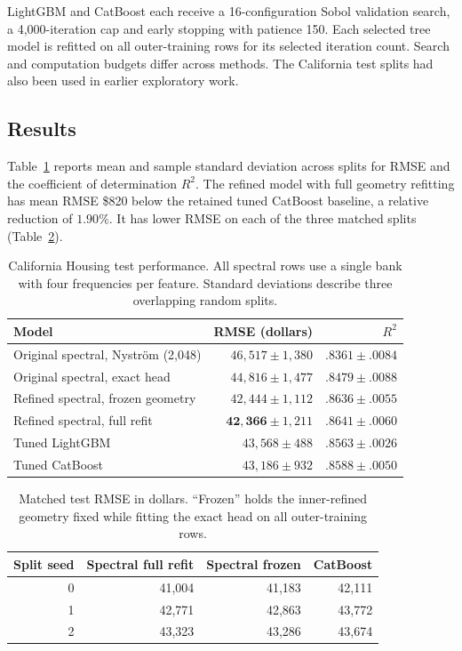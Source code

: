 \documentclass[11pt]{article}
\begin{document}
LightGBM \cite{ke2017} and CatBoost \cite{prokhorenkova2018} each receive a 16-configuration Sobol validation search, a 4,000-iteration cap and early stopping with patience 150. Each selected tree model is refitted on all outer-training rows for its selected iteration count. Search and computation budgets differ across methods. The California test splits had also been used in earlier exploratory work.

\subsection{Results}
Table~\ref{tab:results} reports mean and sample standard deviation across splits for RMSE and the coefficient of determination $R^2$. The refined model with full geometry refitting has mean RMSE \$820 below the retained tuned CatBoost baseline, a relative reduction of $1.90\%$. It has lower RMSE on each of the three matched splits (Table~\ref{tab:splits}).

\begin{table}[htbp]
\centering\small
\caption{California Housing test performance. All spectral rows use a single bank with four frequencies per feature. Standard deviations describe three overlapping random splits.}\label{tab:results}
\begin{tabular}{lrr}\toprule
Model & RMSE (dollars) & $R^2$ \\\midrule
Original spectral, Nystr\"om (2,048) & $46{,}517\pm1{,}380$ & $.8361\pm.0084$\\
Original spectral, exact head & $44{,}816\pm1{,}477$ & $.8479\pm.0088$\\
Refined spectral, frozen geometry & $42{,}444\pm1{,}112$ & $.8636\pm.0055$\\
Refined spectral, full refit & $\mathbf{42{,}366}\pm1{,}211$ & $\mathbf{.8641}\pm.0060$\\
Tuned LightGBM & $43{,}568\pm488$ & $.8563\pm.0026$\\
Tuned CatBoost & $43{,}186\pm932$ & $.8588\pm.0050$\\\bottomrule
\end{tabular}
\end{table}

\begin{table}[htbp]
\centering\small
\caption{Matched test RMSE in dollars. ``Frozen'' holds the inner-refined geometry fixed while fitting the exact head on all outer-training rows.}\label{tab:splits}
\begin{tabular}{rrrr}\toprule
Split seed & Spectral full refit & Spectral frozen & CatBoost\\\midrule
0 & 41,004 & 41,183 & 42,111\\
1 & 42,771 & 42,863 & 43,772\\
2 & 43,323 & 43,286 & 43,674\\\bottomrule
\end{tabular}
\end{table}
\end{document}
